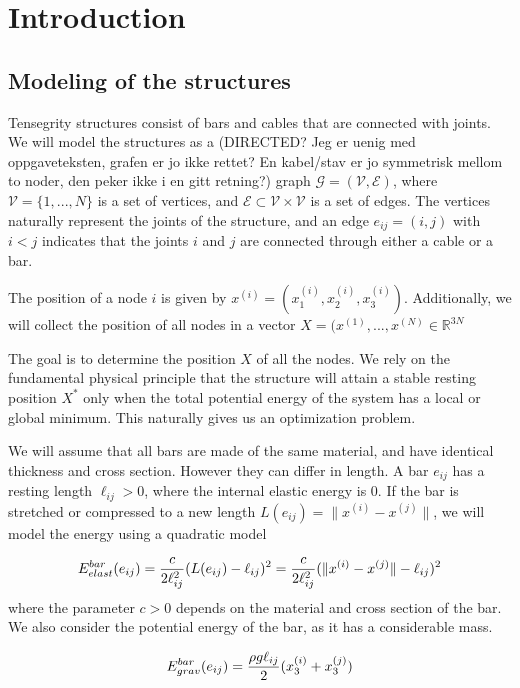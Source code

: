 \section{Introduction}
\subsection{Modeling of the structures}
Tensegrity structures consist of bars and cables that are connected with joints. We will model the structures as a (DIRECTED? Jeg er uenig med oppgaveteksten, grafen er jo ikke rettet? En kabel/stav er jo symmetrisk mellom to noder, den peker ikke i en gitt retning?) graph $\mathcal{G} = (\mathcal{V},\mathcal{E})$, where $\mathcal{V} = \{1,...,N\}$ is a set of vertices, and $\mathcal{E} \subset \mathcal{V} \times \mathcal{V}$ is a set of edges. The vertices naturally represent the joints of the structure, and an edge $e_{ij} = (i,j)$ with $i < j$ indicates that the joints $i$ and $j$ are connected through either a cable or a bar.

The position of a node $i$ is given by $x^{(i)} = (x_1^{(i)},x_2^{(i)},x_3^{(i)})$. Additionally, we will collect the position of all nodes in a vector $X = (x^{(1)},...,x^{(N)} \in \mathbb{R}^{3N}$

The goal is to determine the position $X$ of all the nodes. We rely on the fundamental physical principle that the structure will attain a stable resting position $X^*$ only when the total potential energy of the system has a local or global minimum. This naturally gives us an optimization problem.

We will assume that all bars are made of the same material, and have identical thickness and cross section. However they can differ in length. A bar $e_{ij}$ has a resting length $\ell_{ij}>0$, where the internal elastic energy is $0$. If the bar is stretched or compressed to a new length $L(e_{ij})=\lVert x^{(i)} - x^{(j)}\rVert$, we will model the energy using a quadratic model


\begin{equation}
    E^{bar}_{elast}(e_{ij}) = \frac{c}{2\ell_{ij}^2}(L(e_{ij}) - \ell_{ij})^2 = \frac{c}{2 \ell_{ij}^2}(\lVert x^{(i)} - x^{(j)}\rVert - \ell_{ij})^2
    \label{barElast}
\end{equation}
where the parameter $c > 0$ depends on the material and cross section of the bar. We also consider the potential energy of the bar, as it has a considerable mass.

\begin{equation}
    E^{bar}_{grav}(e_{ij}) = \frac{\rho g \ell_{ij}}{2}(x_3^{(i)}+x_3^{(j)})
    \label{barGrav}
\end{equation}

